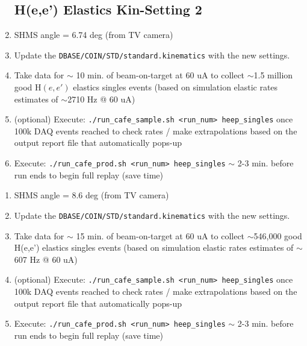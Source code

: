 \documentclass{article}
\begin{document}
    \begin{enumerate}
    \subsection*{H(e,e') Elastics Kin-Setting 2}
    \item SHMS angle = 6.74 deg (from TV camera)
    \item Update the \texttt{DBASE/COIN/STD/standard.kinematics} with the new settings.
    \item Take data for $\sim$ 10  min. of beam-on-target at 60 uA to collect $\sim$1.5 million \\
    good H$(e,e')$ elastics singles events (based on simulation elastic rates estimates of $\sim$2710 Hz @ 60 uA)
    \item (optional) Execute: \texttt{./run\_cafe\_sample.sh <run\_num> heep\_singles} once 100k DAQ events reached to check rates / make extrapolations based on the output report file that automatically pops-up
    \item Execute: \texttt{./run\_cafe\_prod.sh <run\_num> heep\_singles} $\sim$ 2-3 min. before run ends to begin full replay (save time) 
    \end{enumerate}
    
    \begin{enumerate}
    \subsection*{H(e,e') Elastics Kin-Setting 1}
    \item SHMS angle = 8.6 deg (from TV camera)
    \item Update the \texttt{DBASE/COIN/STD/standard.kinematics} with the new settings.
    \item Take data for $\sim$ 15  min. of beam-on-target at 60 uA to collect $\sim$546,000
    good H(e,e') elastics singles events (based on simulation elastic rates estimates of $\sim$607 Hz @ 60 uA)
    \item (optional) Execute: \texttt{./run\_cafe\_sample.sh <run\_num> heep\_singles} once 100k DAQ events reached to check rates / make extrapolations based on the output report file that automatically pops-up
    \item Execute: \texttt{./run\_cafe\_prod.sh <run\_num> heep\_singles} $\sim$ 2-3 min. before run ends to begin full replay (save time)
    \end{enumerate}
    
\end{document}
